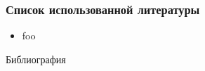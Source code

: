 \appendix

\begin{frame}
    \frametitle{Список использованной литературы}

    \begin{itemize}
        \item foo \cite{bib:cotelnikov}
    \end{itemize}
\end{frame}

\begin{frame}[allowframebreaks]{Библиография}
    
    
\end{frame}

\begin{frame}
    \begin{center}
    \end{center}
\end{frame}

